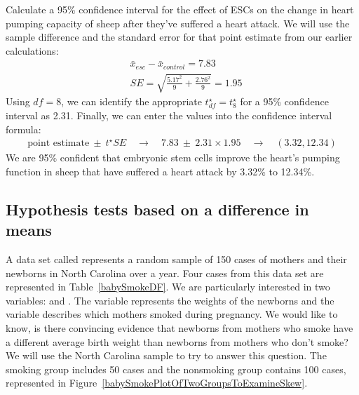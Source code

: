 {\begin{example}{Calculate a 95\% confidence interval for the effect of ESCs on the change in heart pumping capacity of sheep after they've suffered a heart attack.}
We will use the sample difference and the standard error for that point estimate from our earlier calculations:
\begin{align*}
& \bar{x}_{esc} - \bar{x}_{control} = 7.83 \\
& SE = \sqrt{\frac{5.17^2}{9} + \frac{2.76^2}{9}} = 1.95
\end{align*}
Using $df = 8$, we can identify the appropriate $t^{\star}_{df} = t^{\star}_{8}$ for a 95\% confidence interval as 2.31. Finally, we can enter the values into the confidence interval formula:
\begin{align*}
\text{point estimate} \ \pm\ t^{\star}SE \quad\rightarrow\quad
7.83 \ \pm\ 2.31\times 1.95 \quad\rightarrow\quad (3.32, 12.34)
\end{align*}
We are 95\% confident that embryonic stem cells improve the heart's pumping function in sheep that have suffered a heart attack by 3.32\% to 12.34\%.
\end{example}



\subsection{Hypothesis tests based on a difference in means}


A data set called  represents a random sample of 150 cases of mothers and their newborns in North Carolina over a year. Four cases from this data set are represented in Table~\ref{babySmokeDF}. We are particularly interested in two variables:  and . The  variable represents the weights of the newborns and the  variable describes which mothers smoked during pregnancy. We would like to know, is there convincing evidence that newborns from mothers who smoke have a different average birth weight than newborns from mothers who don't smoke? We will use the North Carolina sample to try to answer this question. The smoking group includes 50 cases and the nonsmoking group contains 100 cases, represented in Figure~\ref{babySmokePlotOfTwoGroupsToExamineSkew}.

}
